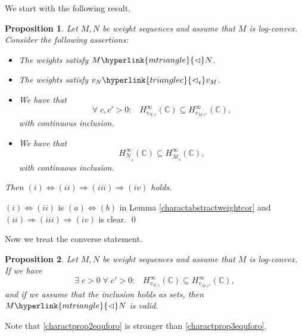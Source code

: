 \documentclass[10pt]{amsart}%
\numberwithin{equation}{section}
\theoremstyle{plain}
\newtheorem{proposition}{Proposition}[section]
\newcommand{\CC}{\mathbb{C}}
\begin{document}
We start with the following result.

\begin{proposition}\label{charactprop2foro}
	Let $M,N$ be weight sequences and assume that $M$ is log-convex. Consider the following assertions:
	\begin{itemize}
		\item[$(i)$] The weights satisfy $M\hyperlink{mtriangle}{\vartriangleleft}N$.
		
		\item[$(ii)$] The weights satisfy $v_N\hyperlink{trianglec}{\vartriangleleft_{\mathfrak{c}}}v_M$.
		
		\item[$(iii)$] We have that
		\begin{equation}\label{charactprop2equforo}
			\forall\;c,c'>0:\;\;\;H^{\infty}_{v_{N,c}}(\CC)\subseteq H^{\infty}_{v_{M,c'}}(\CC),
		\end{equation}
		with continuous inclusion.
		\item[$(iv)$] We have that
		\begin{equation}\label{charactprop2equ1foro}
			H^{\infty}_{\underline{\mathcal{N}}_{\mathfrak{c}}}(\CC)\subseteq H^{\infty}_{\overline{\mathcal{M}}_{\mathfrak{c}}}(\CC),
		\end{equation}
		with continuous inclusion.
	\end{itemize}
	Then $(i)\Leftrightarrow(ii)\Rightarrow(iii)\Rightarrow(iv)$ holds.
\end{proposition}

$(i)\Leftrightarrow(ii)$ is $(a)\Leftrightarrow(b)$ in Lemma \ref{charactabstractweightcor} and $(ii)\Rightarrow(iii)\Rightarrow(iv)$ is clear.
\qed\enddemo

Now we treat the converse statement.

\begin{proposition}\label{charactprop3foro}
	Let $M,N$ be weight sequences and assume that $M$ is log-convex. If we have
	\begin{equation}\label{charactprop3equforo}
		\exists\;c>0\;\forall\;c'>0:\;\;\;H^{\infty}_{v_{N,c}}(\CC)\subseteq H^{\infty}_{v_{M,c'}}(\CC),
	\end{equation}
	and if we assume that the inclusion holds as sets, then $M\hyperlink{mtriangle}{\vartriangleleft}N$ is valid.
\end{proposition}
Note that \eqref{charactprop2equforo} is stronger than \eqref{charactprop3equforo}.
\end{document}
